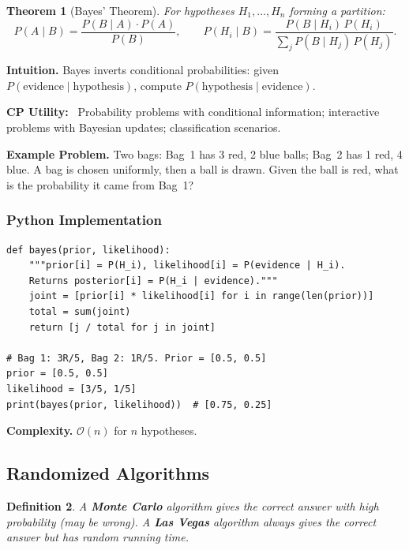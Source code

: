 \documentclass[10pt,a4paper]{article}
\theoremstyle{cpstyle}
\newtheorem{theorem}{Theorem}[section]
\newtheorem{definition}[theorem]{Definition}
\newenvironment{cputility}{%
  \begin{mdframed}[backgroundcolor=theorembg, linecolor=accent!50, linewidth=1pt,
    innerleftmargin=10pt, innerrightmargin=10pt, innertopmargin=6pt, innerbottommargin=6pt]
  \textbf{\color{accent}CP Utility:}~}{%
  \end{mdframed}}
\newcommand{\bigO}[1]{\mathcal{O}\!\left(#1\right)}
\begin{document}
\begin{theorem}[Bayes' Theorem]
For hypotheses $H_1, \ldots, H_n$ forming a partition:
\[
  P(A \mid B) = \frac{P(B \mid A) \cdot P(A)}{P(B)}, \qquad
  P(H_i \mid B) = \frac{P(B \mid H_i)\, P(H_i)}{\sum_j P(B \mid H_j)\, P(H_j)}.
\]
\end{theorem}

\textbf{Intuition.} Bayes inverts conditional probabilities: given $P(\text{evidence} \mid \text{hypothesis})$, compute $P(\text{hypothesis} \mid \text{evidence})$.

\begin{cputility}
Probability problems with conditional information; interactive problems with Bayesian updates; classification scenarios.
\end{cputility}

\textbf{Example Problem.} Two bags: Bag~1 has 3 red, 2 blue balls; Bag~2 has 1 red, 4 blue. A bag is chosen uniformly, then a ball is drawn. Given the ball is red, what is the probability it came from Bag~1?

\subsubsection{Python Implementation}
\begin{lstlisting}[caption={Bayes' Theorem -- posterior computation}]
def bayes(prior, likelihood):
    """prior[i] = P(H_i), likelihood[i] = P(evidence | H_i).
    Returns posterior[i] = P(H_i | evidence)."""
    joint = [prior[i] * likelihood[i] for i in range(len(prior))]
    total = sum(joint)
    return [j / total for j in joint]

# Bag 1: 3R/5, Bag 2: 1R/5. Prior = [0.5, 0.5]
prior = [0.5, 0.5]
likelihood = [3/5, 1/5]
print(bayes(prior, likelihood))  # [0.75, 0.25]
\end{lstlisting}

\textbf{Complexity.} $\bigO{n}$ for $n$ hypotheses.

\subsection{Randomized Algorithms}

\begin{definition}
A \textbf{Monte Carlo} algorithm gives the correct answer with high probability (may be wrong). A \textbf{Las Vegas} algorithm always gives the correct answer but has random running time.
\end{definition}
\end{document}
